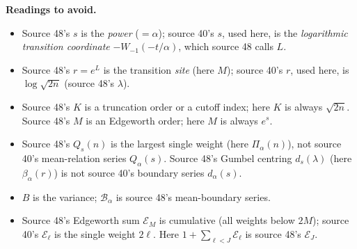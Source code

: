 \documentclass[11pt]{article}
\numberwithin{equation}{section}
\theoremstyle{definition}\newtheorem{definition}[theorem]{Definition}
\theoremstyle{remark}\newtheorem{remark}[theorem]{Remark}
\newcommand{\Bop}{\mathcal B_\alpha}
\begin{document}
\noindent\textbf{Readings to avoid.}
\begin{itemize}
\item Source 48's $s$ is the \emph{power} ($=\alpha$); source 40's $s$, used
      here, is the \emph{logarithmic transition coordinate}
      $-W_{-1}(-t/\alpha)$, which source 48 calls $L$.
\item Source 48's $r=e^L$ is the transition \emph{site} (here $M$); source
      40's $r$, used here, is $\log\sqrt{2n}$ (source 48's $\lambda$).
\item Source 48's $K$ is a truncation order or a cutoff index; here $K$ is
      always $\sqrt{2n}$.  Source 48's $M$ is an Edgeworth order; here $M$ is
      always $e^s$.
\item Source 48's $Q_s(n)$ is the largest single weight (here $\Pi_\alpha(n)$),
      not source 40's mean-relation series $Q_\alpha(s)$.  Source 48's
      Gumbel centring $d_s(\lambda)$ (here $\beta_\alpha(r)$) is not source
      40's boundary series $d_\alpha(s)$.
\item $B$ is the variance; $\Bop$ is source 48's mean-boundary series.
\item Source 48's Edgeworth sum $\mathcal E_M$ is cumulative (all weights
      below $2M$); source 40's $\mathcal E_\ell$ is the single weight $2\ell$.
      Here $1+\sum_{\ell<J}\mathcal E_\ell$ is source 48's $\mathcal E_J$.
\end{itemize}
\end{document}
